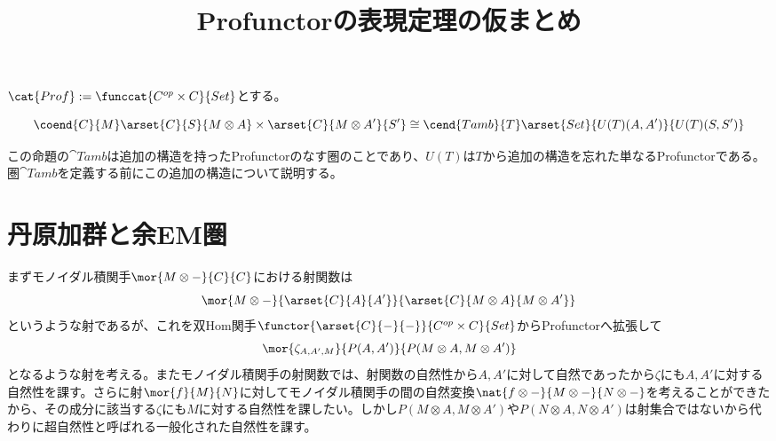 \documentclass[uplatex,dvipdfmx]{jsarticle}
\begin{document}
  \title{Profunctorの表現定理の仮まとめ}

  $\cat{Prof} := \funccat{C^{op}\times C}{Set}$とする。

  \begin{prop}[Profunctorの表現定理]
    \[\coend{C}{M}\arset{C}{S}{M\otimes A}\times\arset{C}{M\otimes A'}{S'}\cong\cend{Tamb}{T}\arset{Set}{U(T)(A,A')}{U(T)(S,S')}\]
  \end{prop}

  この命題の$\cat{Tamb}$は追加の構造を持ったProfunctorのなす圏のことであり、$U(T)$は$T$から追加の構造を忘れた単なるProfunctorである。圏$\cat{Tamb}$を定義する前にこの追加の構造について説明する。

  \section{丹原加群と余EM圏}
  まずモノイダル積関手$\mor{M\otimes -}{C}{C}$における射関数は\[\mor{M\otimes -}{\arset{C}{A}{A'}}{\arset{C}{M\otimes A}{M\otimes A'}}\]というような射であるが、これを双Hom関手$\functor{\arset{C}{-}{-}}{C^{op}\times C}{Set}$からProfunctorへ拡張して
  \[\mor{\zeta_{A,A',M}}{P(A,A')}{P(M\otimes A, M\otimes A')}\]となるような射を考える。またモノイダル積関手の射関数では、射関数の自然性から$A,A'$に対して自然であったから$\zeta$にも$A,A'$に対する自然性を課す。さらに射$\mor{f}{M}{N}$に対してモノイダル積関手の間の自然変換$\nat{f\otimes -}{M\otimes -}{N\otimes -}$を考えることができたから、その成分に該当する$\zeta$にも$M$に対する自然性を課したい。しかし$P(M\otimes A,M\otimes A')$や$P(N\otimes A, N\otimes A')$は射集合ではないから代わりに超自然性と呼ばれる一般化された自然性を課す。
\end{document}
